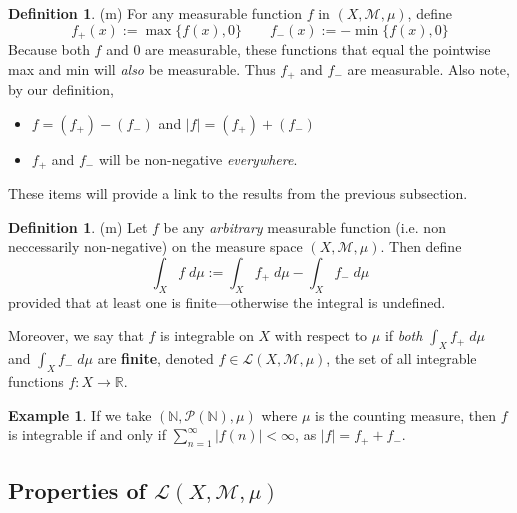 \documentclass[12pt]{article}
\theoremstyle{plain}
\theoremstyle{definition}
\newtheorem{defn}[thm]{Definition}
\newtheorem{ex}[thm]{Example}
\theoremstyle{remark}
\begin{document}
\begin{defn} (m)
For any measurable function $f$ in $(X,\mathscr{M},\mu)$, define
\[
    f_+(x) := \max\{f(x), 0\}
    \qquad
    f_-(x) := -\min\{f(x), 0\}
\]
Because both $f$ and $0$ are measurable, these functions that equal the pointwise max and min will \emph{also} be measurable. Thus $f_+$ and $f_-$ are measurable. Also note, by our definition, 
\begin{itemize}
    \item $f = (f_+) - (f_-)$ and $|f| = (f_+) + (f_-)$
    \item $f_+$ and $f_-$ will be non-negative \emph{everywhere}.  
\end{itemize}
These items will provide a link to the results from the previous subsection.
\end{defn}

\begin{defn} (m)
Let $f$ be any \emph{arbitrary} measurable function (i.e. non neccessarily non-negative) on the measure space $(X,\mathscr{M},\mu)$. Then define 
\[
    \int_X f\; d\mu := \int_X f_+ \; d\mu - \int_X f_- \; d\mu
\]
provided that at least one is finite---otherwise the integral is undefined.

Moreover, we say that $f$ is integrable on $X$ with respect to $\mu$ if \emph{both} $\int_X f_+ \; d\mu$ and $\int_X f_- \; d\mu$ are \textbf{finite}, denoted $f\in\mathscr{L}(X,\mathscr{M},\mu)$, the set of all integrable functions $f:X\rightarrow\mathbb{R}$.
\end{defn}

\begin{ex}
    If we take $(\mathbb{N}, \mathscr{P}(\mathbb{N}), \mu)$ where $\mu$ is the counting measure, then $f$ is integrable if and only if $\sum^\infty_{n=1}|f(n)|<\infty$, as $|f| = f_+ + f_-$.
\end{ex}

\subsection{Properties of $\mathscr{L}(X,\mathscr{M},\mu)$}
\end{document}
